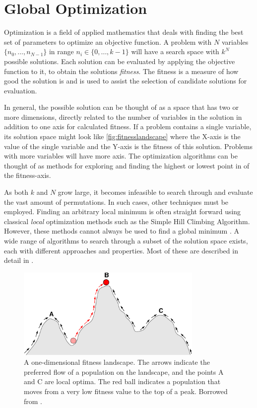 \section{Global Optimization}

Optimization is a field of applied mathematics that deals with finding the best
set of parameters to optimize an objective function. A problem with $N$
variables $\{n_0, \dots, n_{N-1}\}$ in range $n_i \in \{0, \dots, k-1\}$ will
have a search space with $k^N$ possible solutions. Each solution can be
evaluated by applying the objective function to it, to obtain the solutions
\emph{fitness}. The fitness is a measure of how good the solution is and is used
to assist the selection of candidate solutions for evaluation.

In general, the possible solution can be thought of as a space that has two or
more dimensions, directly related to the number of variables in the solution
in addition to one axis for calculated fitness. If a problem contains a single
variable, its solution space might look like \autoref{fig:fitnesslandscape}
where the X-axis is the value of the single variable and the Y-axis is the
fitness of this solution. Problems with more variables will have more axis. The
optimization algorithms can be thought of as methods for exploring and finding
the highest or lowest point in of the fitness-axis.

As both $k$ and $N$ grow large, it becomes infeasible to search through and
evaluate the vast amount of permutations. In such cases, other techniques must
be employed. Finding an arbitrary local minimum is often straight forward using
classical \emph{local} optimization methods such as the Simple Hill Climbing
Algorithm. However, these methods cannot always be used to find a global minimum
\cite{russellnorvig}. A wide range of algorithms to search through a subset of
the solution space exists, each with different approaches and properties.
Most of these are described in detail in \cite{russellnorvig}.

\begin{figure}[bth]
    \centering
    \includegraphics[width=0.8\textwidth]{figs/Fitness-landscape-cartoon.png}
    \caption{A one-dimensional fitness landscape. The arrows indicate the
        preferred flow of a population on the landscape, and the points A and C
        are local optima. The red ball indicates a population that moves from a
        very low fitness value to the top of a peak. Borrowed from \cite{wikifitnesslandscape}.}
    \label{fig:fitnesslandscape}
\end{figure}

